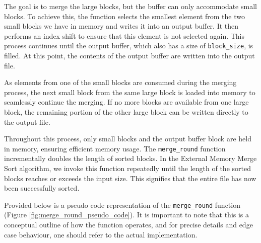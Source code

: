 \documentclass[twocolumn]{article}
\begin{document}
The goal is to merge the large blocks, but the buffer can only accommodate small blocks.
To achieve this, the function selects the smallest element from the two small blocks we have in memory and writes it into an output buffer.
It then performs an index shift to ensure that this element is not selected again. This process continues until the output buffer, which also has a size of \texttt{block\_size}, is filled.
At this point, the contents of the output buffer are written into the output file.

As elements from one of the small blocks are consumed during the merging process, the next small block from the same large block is loaded into memory to seamlessly continue the merging.
If no more blocks are available from one large block, the remaining portion of the other large block can be written directly to the output file.

Throughout this process, only small blocks and the output buffer block are held in memory, ensuring efficient memory usage.
The \texttt{merge\_round} function incrementally doubles the length of sorted blocks.
In the External Memory Merge Sort algorithm, we invoke this function repeatedly until the length of the sorted blocks reaches or exceeds the input size.
This signifies that the entire file has now been successfully sorted.

Provided below is a pseudo code representation of the \texttt{merge\_round} function (Figure \ref{fig:merge_round_pseudo_code}).
It is important to note that this is a conceptual outline of how the function operates, and for precise details and edge case behaviour, one should refer to the actual implementation.
\end{document}
